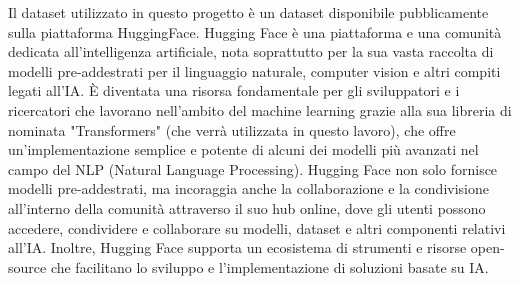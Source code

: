 \documentclass[../../Thesis.tex]{subfiles}
\begin{document}
Il dataset \cite{rossini2022slitherauditedcontracts} utilizzato in questo progetto è un dataset disponibile pubblicamente sulla piattaforma HuggingFace. Hugging Face è una piattaforma e una comunità dedicata all'intelligenza artificiale, nota soprattutto per la sua vasta raccolta di modelli pre-addestrati per il linguaggio naturale, computer vision e altri compiti legati all'IA. È diventata una risorsa fondamentale per gli sviluppatori e i ricercatori che lavorano nell'ambito del machine learning grazie alla sua libreria di nominata "Transformers" (che verrà utilizzata in questo lavoro), che offre un'implementazione semplice e potente di alcuni dei modelli più avanzati nel campo del NLP (Natural Language Processing). Hugging Face non solo fornisce modelli pre-addestrati, ma incoraggia anche la collaborazione e la condivisione all'interno della comunità attraverso il suo hub online, dove gli utenti possono accedere, condividere e collaborare su modelli, dataset e altri componenti relativi all'IA. Inoltre, Hugging Face supporta un ecosistema di strumenti e risorse open-source che facilitano lo sviluppo e l'implementazione di soluzioni basate su IA.
\end{document}
